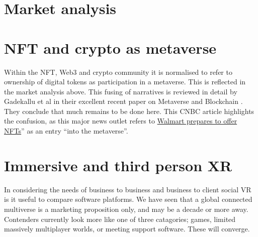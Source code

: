 \section{Market analysis}

\section{NFT and crypto as metaverse}
Within the NFT, Web3 and crypto community it is normalised to refer to ownership of digital tokens as participation in a metaverse. This is reflected in the market analysis above. This fusing of narratives is reviewed in detail by Gadekallu et al in their excellent recent paper on Metaverse and Blockchain \cite{gadekallu2022blockchain}. They conclude that much remains to be done here. This CNBC article highlights the confusion, as this major news outlet refers to \href{https://www.cnbc.com/2022/01/16/walmart-is-quietly-preparing-to-enter-the-metaverse.html}{Walmart prepares to offer NFTs}'' as an entry ``into the metaverse''.
\section{Immersive and third person XR}
In considering the needs of business to business and business to client social VR is it useful to compare software platforms. We have seen that a global connected multiverse is a marketing proposition only, and may be a decade or more away. Contenders currently look more like one of three catagories; games, limited massively multiplayer worlds, or meeting support software. These will converge.

